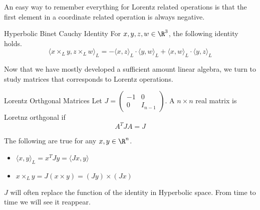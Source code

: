 \documentclass[a4paper]{article}
\begin{document}
An easy way to remember everything for Lorentz related operations is that the first element in a coordinate related operation is always negative. 

\begin{lmm}{Hyperbolic Binet Cauchy Identity}{} For $x,y,z,w\in\R^3$, the following identity holds. $$\langle x\times_Ly,z\times_L w\rangle_L=-\langle x,z\rangle_L\cdot\langle y,w\rangle_L+\langle x,w\rangle_L\cdot\langle y,z\rangle_L$$
\end{lmm}

Now that we have mostly developed a sufficient amount linear algebra, we turn to study matrices that corresponds to Lorentz operations. 

\begin{defn}{Lorentz Orthgonal Matrices}{} Let $J=\begin{pmatrix}-1&0\\0&I_{n-1}\end{pmatrix}$. A $n\times n$ real matrix is Loretnz orthgonal if $$A^TJA=J$$
\end{defn}

\begin{prp}{}{} The following are true for any $x,y\in\R^n$. 
\begin{itemize}
\item $\langle x,y\rangle_L=x^TJy=\langle Jx,y\rangle$
\item $x\times_Ly=J(x\times y)=(Jy)\times(Jx)$
\end{itemize}
\end{prp}

$J$ will often replace the function of the identity in Hyperbolic space. From time to time we will see it reappear. 
\end{document}
